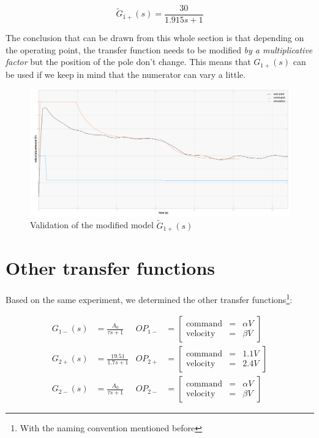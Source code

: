 \begin{equation}
    \tilde{G}_{1+}(s) = \frac{30}{1.915 s + 1}
\end{equation}

The conclusion that can be drawn from this whole section is that depending on the operating point, the transfer function
needs to be modified \textit{by a multiplicative factor} but the position of the pole don't change. This means that 
$G_{1+}(s)$ can be used if we keep in mind that the numerator can vary a little.

\begin{figure}[H]
    \centering
    \includegraphics[height=\textheight/3]{Pictures/validation_A0_30.png}
    \caption{Validation of the modified model $\tilde{G}_{1+}(s)$}
    \label{fig:validation_A0_30}
\end{figure}

\section{Other transfer functions}

Based on the same experiment, we determined the other transfer functions\footnote{With the naming convention mentioned 
before}:

\begin{align}
    G_{1-}(s) &= \frac{A_0}{\tau s + 1} & OP_{1-} &= \begin{bmatrix}
                \text{command} & = & \alpha V \\
                \text{velocity} & = & \beta V
                \end{bmatrix} 
    \label{TF_mot1_-} \\
    G_{2+}(s) &= \frac{19.51}{1.7 s + 1} & OP_{2+} &= \begin{bmatrix}
                \text{command} & = & 1.1 V \\
                \text{velocity} & = & 2.4 V
                \end{bmatrix} 
    \label{TF_mot2_+} \\
    G_{2-}(s) &= \frac{A_0}{\tau s + 1} & OP_{2-} &= \begin{bmatrix}
                \text{command} & = & \alpha V \\
                \text{velocity} & = & \beta V
                \end{bmatrix} 
    \label{TF_mot2_-}
\end{align}


